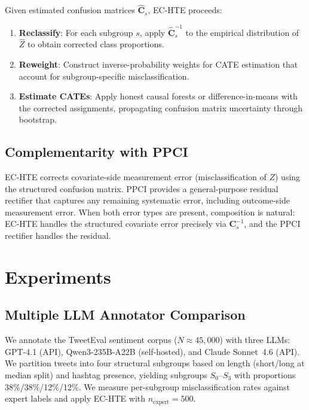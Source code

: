 \documentclass[11pt,a4paper]{article}
\begin{document}
Given estimated confusion matrices $\hat{\mathbf{C}}_s$, EC-HTE proceeds:

\begin{enumerate}[leftmargin=*,itemsep=2pt]
\item \textbf{Reclassify}: For each subgroup $s$, apply $\hat{\mathbf{C}}_s^{-1}$ to the empirical distribution of $\hat{Z}$ to obtain corrected class proportions.
\item \textbf{Reweight}: Construct inverse-probability weights for CATE estimation that account for subgroup-specific misclassification.
\item \textbf{Estimate CATEs}: Apply honest causal forests \citep{wager2018} or difference-in-means with the corrected assignments, propagating confusion matrix uncertainty through bootstrap.
\end{enumerate}

\subsection{Complementarity with PPCI}

EC-HTE corrects covariate-side measurement error (misclassification of $Z$) using the structured confusion matrix.
PPCI \citep{sui2026} provides a general-purpose residual rectifier that captures any remaining systematic error, including outcome-side measurement error.
When both error types are present, composition is natural: EC-HTE handles the structured covariate error precisely via $\mathbf{C}_s^{-1}$, and the PPCI rectifier handles the residual.

\section{Experiments}

\subsection{Multiple LLM Annotator Comparison}\label{sec:llm_comparison}

We annotate the TweetEval sentiment corpus ($N \approx 45{,}000$) with three LLMs: GPT-4.1 (API), Qwen3-235B-A22B (self-hosted), and Claude Sonnet~4.6 (API).
We partition tweets into four structural subgroups based on length (short/long at median split) and hashtag presence, yielding subgroups $S_0$--$S_3$ with proportions 38\%/38\%/12\%/12\%.
We measure per-subgroup misclassification rates against expert labels and apply EC-HTE with $n_{\text{expert}} = 500$.
\end{document}
